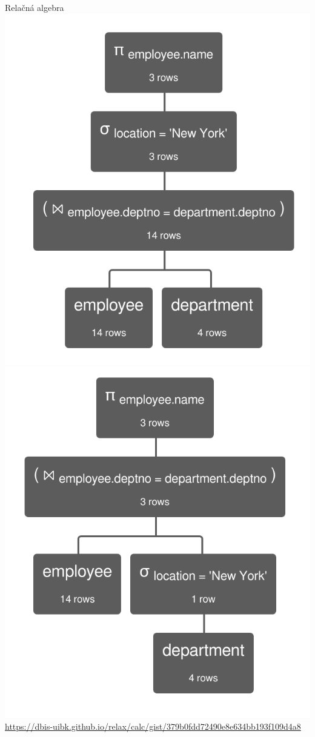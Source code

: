 \documentclass[12pt]{beamer}
\begin{document}
\begin{frame}[fragile]{Relačná algebra}
\includegraphics[scale=.2]{query1.jpg}
\includegraphics[scale=.2]{query2.jpg}\\[3mm]
\tiny{\url{https://dbis-uibk.github.io/relax/calc/gist/379b0fdd72490e8e634bb193f109d4a8}}
\end{frame}
\end{document}
